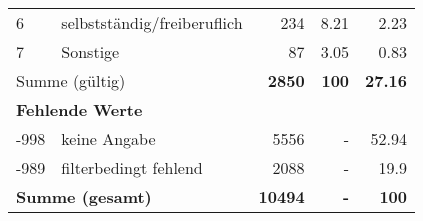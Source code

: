 \begin{longtable}{lXrrr}
     6 &
     \multicolumn{1}{X}{ selbstständig/freiberuflich   } &


       \num{234} &
       \num[round-mode=places,round-precision=2]{8,21} &
         \num[round-mode=places,round-precision=2]{2,23} \\

     7 &
     \multicolumn{1}{X}{ Sonstige   } &


       \num{87} &
       \num[round-mode=places,round-precision=2]{3,05} &
         \num[round-mode=places,round-precision=2]{0,83} \\
     \midrule
     \multicolumn{2}{l}{Summe (gültig)} &
       \textbf{\num{2850}} &
     \textbf{100} &
       \textbf{\num[round-mode=places,round-precision=2]{27,16}} \\
     \multicolumn{5}{l}{\textbf{Fehlende Werte}}\\
       -998 &
       keine Angabe &
         \num{5556} &
        - &
         \num[round-mode=places,round-precision=2]{52,94} \\
       -989 &
       filterbedingt fehlend &
         \num{2088} &
        - &
         \num[round-mode=places,round-precision=2]{19,9} \\
     \midrule
     \multicolumn{2}{l}{\textbf{Summe (gesamt)}} &
          \textbf{\num{10494}} &
        \textbf{-} &
        \textbf{100} \\
     \bottomrule
     \end{longtable}
     

